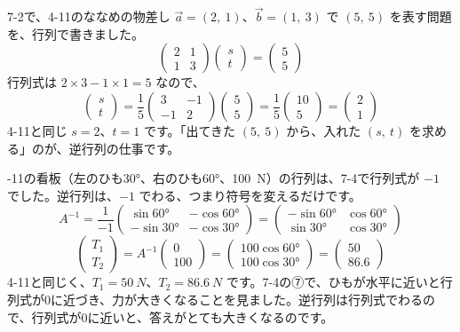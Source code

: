 7-2で、4-11のななめの物差し $\vec a=(2,\ 1)$、$\vec b=(1,\ 3)$ で $(5,\ 5)$ を表す問題を、行列で書きました。
\[ \begin{pmatrix}2&1\\1&3\end{pmatrix}\begin{pmatrix}s\\t\end{pmatrix}=\begin{pmatrix}5\\5\end{pmatrix} \]
行列式は $2\times3-1\times1=5$ なので、
\[ \begin{pmatrix}s\\t\end{pmatrix}=\frac{1}{5}\begin{pmatrix}3&-1\\-1&2\end{pmatrix}\begin{pmatrix}5\\5\end{pmatrix}=\frac{1}{5}\begin{pmatrix}10\\5\end{pmatrix}=\begin{pmatrix}2\\1\end{pmatrix} \]
4-11と同じ $s=2$、$t=1$ です。「出てきた $(5,\ 5)$ から、入れた $(s,\ t)$ を求める」のが、逆行列の仕事です。

-11の看板（左のひも30°、右のひも60°、\qty{100}{N}）の行列は、7-4で行列式が $-1$ でした。逆行列は、$-1$ でわる、つまり符号を変えるだけです。
\[ A^{-1}=\frac{1}{-1}\begin{pmatrix}\sin60°&-\cos60°\\-\sin30°&-\cos30°\end{pmatrix}=\begin{pmatrix}-\sin60°&\cos60°\\ \sin30°&\cos30°\end{pmatrix} \]
\[ \begin{pmatrix}T_1\\T_2\end{pmatrix}=A^{-1}\begin{pmatrix}0\\100\end{pmatrix}=\begin{pmatrix}100\cos60°\\100\cos30°\end{pmatrix}=\begin{pmatrix}50\\86.6\end{pmatrix} \]
4-11と同じく、$T_1=\qty{50}{N}$、$T_2=\qty{86.6}{N}$ です。7-4の⑦で、ひもが水平に近いと行列式が0に近づき、力が大きくなることを見ました。逆行列は行列式でわるので、行列式が0に近いと、答えがとても大きくなるのです。


